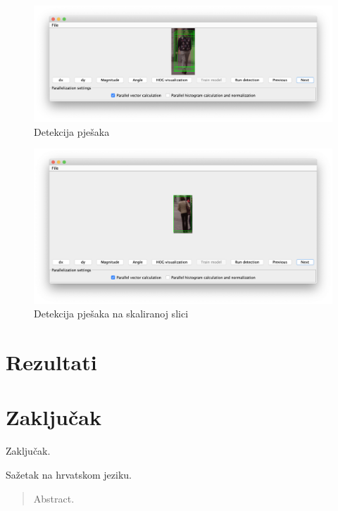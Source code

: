 \documentclass[times, utf8, zavrsni]{fer}
\begin{document}
\begin{figure}[htb]
	\centering
	\includegraphics[width=\linewidth]{figures/detection.png}
	\caption{Detekcija pješaka}
	\label{fig:detection}
\end{figure}

\begin{figure}[htb]
	\centering
	\includegraphics[width=\linewidth]{figures/scaledDetection.png}
	\caption{Detekcija pješaka na skaliranoj slici}
	\label{fig:scaledDetection}
\end{figure}

\chapter{Rezultati}

\chapter{Zaključak}
Zaključak.




\begin{sazetak}
Sažetak na hrvatskom jeziku.

\end{sazetak}

\begin{abstract}
Abstract.

\end{abstract}
\end{document}
